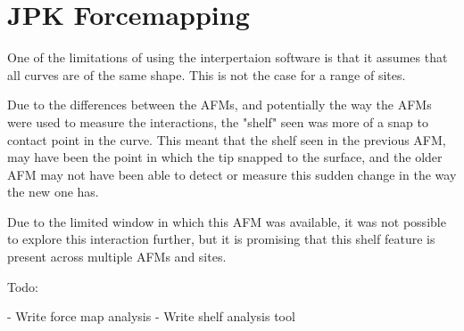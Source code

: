 \section{JPK Forcemapping}

One of the limitations of using the interpertaion software is that it assumes that all curves are of the same shape. This is not the case for a range of sites.

Due to the differences between the AFMs, and potentially the way the AFMs were used to measure the interactions, the "shelf" seen was more of a snap to contact point in the curve. This meant that the shelf seen in the previous AFM, may have been the point in which the tip snapped to the surface, and the older AFM may not have been able to detect or measure this sudden change in the way the new one has. 

Due to the limited window in which this AFM was available, it was not possible to explore this interaction further, but it is promising that this shelf feature is present across multiple AFMs and sites.

Todo:

- Write force map analysis
- Write shelf analysis tool
